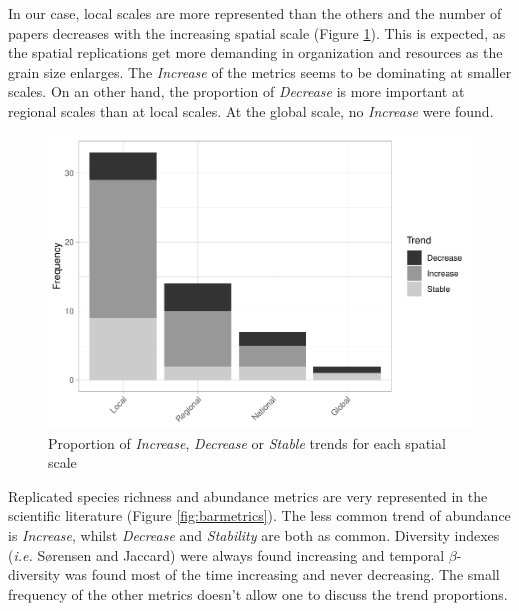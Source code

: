 \documentclass[
  12pt,
  oneside]{report}
\begin{document}
In our case, local scales are more represented than the others and the number of papers decreases with the increasing spatial scale (Figure \ref{fig:barspatscale}). This is expected, as the spatial replications get more demanding in organization and resources as the grain size enlarges. The \emph{Increase} of the metrics seems to be dominating at smaller scales. On an other hand, the proportion of \emph{Decrease} is more important at regional scales than at local scales. At the global scale, no \emph{Increase} were found.

\begin{figure}
\centering
\includegraphics{literature_review_files/figure-latex/barspatscale-1.pdf}
\caption{\label{fig:barspatscale}Proportion of \emph{Increase}, \emph{Decrease} or \emph{Stable} trends for each spatial scale}
\end{figure}

Replicated species richness and abundance metrics are very represented in the scientific literature (Figure \ref{fig:barmetrics}). The less common trend of abundance is \emph{Increase}, whilst \emph{Decrease} and \emph{Stability} are both as common. Diversity indexes (\emph{i.e.} Sørensen and Jaccard) were always found increasing and temporal \(\beta\)-diversity was found most of the time increasing and never decreasing. The small frequency of the other metrics doesn't allow one to discuss the trend proportions.
\end{document}
